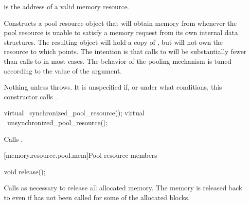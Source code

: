 \begin{itemdescr}
\pnum
\requires
{} is the address of a valid memory resource.

\pnum
\effects
Constructs a pool resource object that will obtain memory from 
whenever the pool resource is unable to satisfy a memory request
from its own internal data structures.
The resulting object will hold a copy of ,
but will not own the resource to which  points.
\enternote
The intention is that calls to 
will be substantially fewer than calls to 
in most cases.\exitnote
The behavior of the pooling mechanism is tuned
according to the value of the  argument.

\pnum
\throws
Nothing unless  throws.
It is unspecified if, or under what conditions,
this constructor calls .
\end{itemdescr}

%
%
\begin{itemdecl}
virtual ~synchronized_pool_resource();
virtual ~unsynchronized_pool_resource();
\end{itemdecl}

\begin{itemdescr}
\pnum
\effects
Calls .
\end{itemdescr}

[memory.resource.pool.mem]{Pool resource members}

%
%
%
%
\begin{itemdecl}
void release();
\end{itemdecl}

\begin{itemdescr}
\pnum
\effects
Calls  as necessary
to release all allocated memory.
\enternote
The memory is released back to 
even if  has not been called
for some of the allocated blocks.\exitnote
\end{itemdescr}

